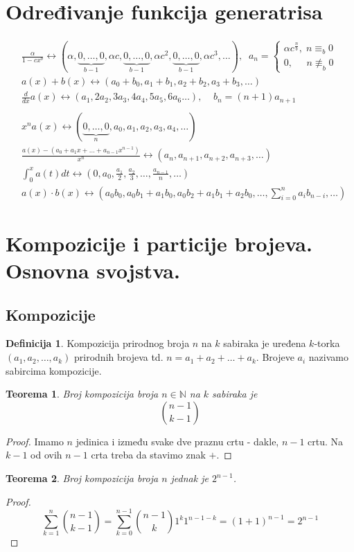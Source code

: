 \documentclass[a4paper,12pt]{article}
\numberwithin{algorithm}{section}
\theoremstyle{plain}
\newtheorem{theorem}{Teorema}[section]
\theoremstyle{definition}
\newtheorem{definition}{Definicija}[section]
\theoremstyle{remark}
\begin{document}
\section{Određivanje funkcija generatrisa}
\[
    \begin{aligned}
        &\frac{\alpha}{1 - cx^b} \leftrightarrow (\alpha, \underbrace{0, \dots, 0}_{b - 1}, \alpha c, \underbrace{0, \dots, 0}_{b - 1}, \alpha c^2, \underbrace{0, \dots, 0}_{b - 1}, \alpha c^3, \dots), \;\; a_n = \begin{cases}
            \alpha c^{\frac{n}{b}}, \; n \equiv_{b} 0 \\
            0, \;\;\;\;\; n \not\equiv_{b} 0
        \end{cases}\\
        &a(x) + b(x) \leftrightarrow (a_0 + b_0, a_1 + b_1, a_2 + b_2, a_3 + b_3, \dots)   \\
        &\frac{d}{dx} a(x) \leftrightarrow (a_1, 2a_2, 3a_3, 4a_4, 5a_5, 6a_6 \dots), \;\;\;\; b_n = (n + 1)a_{n + 1} \\ \\
        &x^n a(x) \leftrightarrow (\underbrace{0, \dots, 0}_{n}, a_0, a_1, a_2, a_3, a_4, \dots) \\
        &\frac{a(x) - (a_0 + a_1x + \dots + a_{n - 1}x^{n - 1})}{x^n} \leftrightarrow (a_n, a_{n +1}, a_{n + 2}, a_{n + 3}, \dots) \\
        &\int_{0}^{x} a(t) dt \leftrightarrow (0, a_0, \frac{a_1}{2}, \frac{a_2}{3}, \dots, \frac{a_{n - 1}}{n}, \dots) \\
        &a(x) \cdot b(x) \leftrightarrow (a_0 b_0, a_0 b_1 + a_1 b_0, a_0 b_2 + a_1 b_1 + a_2 b _0, \dots, \sum_{i = 0}^{n} a_i b_{n - i}, \dots)
    \end{aligned}
\]

\section{Kompozicije i particije brojeva. Osnovna svojstva.}
\subsection{Kompozicije}
\begin{definition}
    Kompozicija prirodnog broja $n$ na $k$ sabiraka je uređena $k$-torka $(a_1, a_2, \ldots, a_k)$
    prirodnih brojeva td. $n = a_1+a_2 + \ldots + a_k$. Brojeve $a_i$ nazivamo sabircima kompozicije.
\end{definition}
\begin{theorem}
    Broj kompozicija broja $n \in \mathbb{N}$ na $k$ sabiraka je
    \[{{n-1} \choose {k-1}}\]
\end{theorem}
\begin{proof}
    Imamo $n$ jedinica i između svake dve praznu crtu - dakle, $n-1$ crtu. Na $k-1$ od ovih $n-1$ crta treba
    da stavimo znak $+$.
\end{proof}
\begin{theorem}
    Broj kompozicija broja $n$ jednak je $2^{n-1}$.
\end{theorem}
\begin{proof}
    \[ \sum_{k=1}^{n} {{n-1} \choose {k-1}} = \sum_{k = 0}^{n-1} {{n-1} \choose k}1^k 1^{n-1-k} = (1+1)^{n-1} = 2^{n-1} \]
\end{proof}
\end{document}
